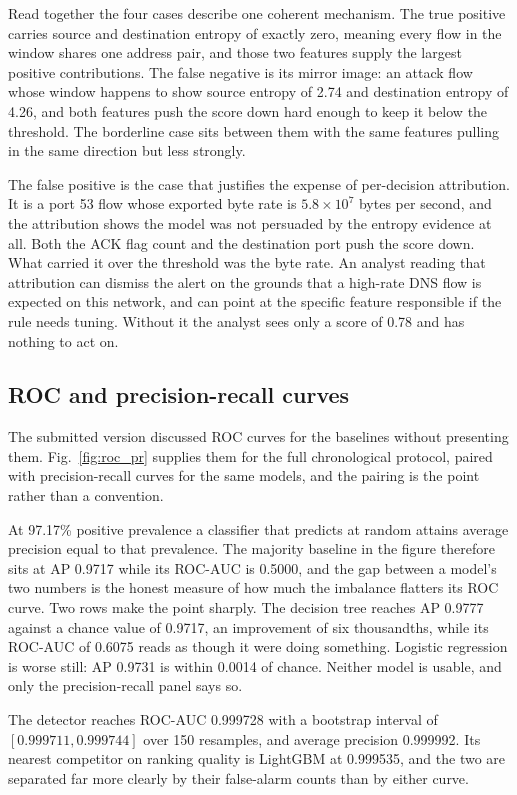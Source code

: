 \documentclass{ieeeaccess}
\begin{document}
Read together the four cases describe one coherent mechanism. The true positive
carries source and destination entropy of exactly zero, meaning every flow in
the window shares one address pair, and those two features supply the largest
positive contributions. The false negative is its mirror image: an attack flow
whose window happens to show source entropy of 2.74 and destination entropy of
4.26, and both features push the score down hard enough to keep it below the
threshold. The borderline case sits between them with the same features pulling
in the same direction but less strongly.

The false positive is the case that justifies the expense of per-decision
attribution. It is a port 53 flow whose exported byte rate is
$5.8\times10^{7}$ bytes per second, and the attribution shows the model was not
persuaded by the entropy evidence at all. Both the ACK flag count and the
destination port push the score down. What carried it over the threshold was the
byte rate. An analyst reading that attribution can dismiss the alert on the
grounds that a high-rate DNS flow is expected on this network, and can point at
the specific feature responsible if the rule needs tuning. Without it the analyst
sees only a score of 0.78 and has nothing to act on.

\subsection{ROC and precision-recall curves}
\label{sec:roc}
The submitted version discussed ROC curves for the baselines without presenting
them. Fig.~\ref{fig:roc_pr} supplies them for the full chronological protocol,
paired with precision-recall curves for the same models, and the pairing is the
point rather than a convention.

At 97.17\% positive prevalence a classifier that predicts at random attains
average precision equal to that prevalence. The majority baseline in the figure
therefore sits at AP 0.9717 while its ROC-AUC is 0.5000, and the gap between a
model's two numbers is the honest measure of how much the imbalance flatters its
ROC curve. Two rows make the point sharply. The decision tree reaches AP 0.9777
against a chance value of 0.9717, an improvement of six thousandths, while its
ROC-AUC of 0.6075 reads as though it were doing something. Logistic regression
is worse still: AP 0.9731 is within 0.0014 of chance. Neither model is usable,
and only the precision-recall panel says so.

The detector reaches ROC-AUC 0.999728 with a bootstrap interval of
$[0.999711, 0.999744]$ over 150 resamples, and average precision 0.999992. Its
nearest competitor on ranking quality is LightGBM at 0.999535, and the two are
separated far more clearly by their false-alarm counts than by either curve.
\end{document}
